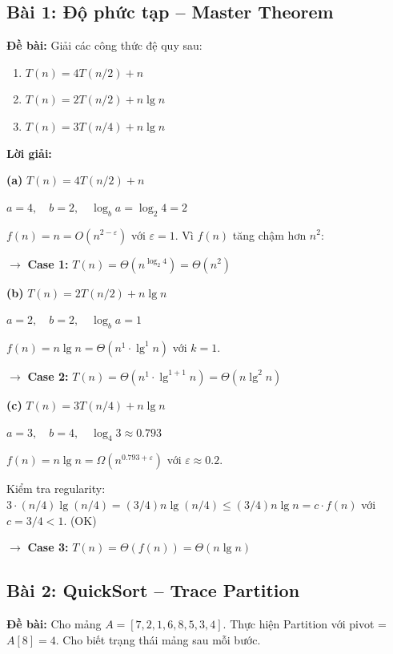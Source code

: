 \documentclass[10pt]{article}
\begin{document}
\subsection{Bài 1: Độ phức tạp -- Master Theorem}

\textbf{Đề bài:} Giải các công thức đệ quy sau:
\begin{enumerate}
\item[(a)] $T(n) = 4T(n/2) + n$
\item[(b)] $T(n) = 2T(n/2) + n \lg n$
\item[(c)] $T(n) = 3T(n/4) + n \lg n$
\end{enumerate}

\textbf{Lời giải:}

\textbf{(a)} $T(n) = 4T(n/2) + n$

$a = 4, \quad b = 2, \quad \log_b a = \log_2 4 = 2$

$f(n) = n = O(n^{2-\varepsilon})$ với $\varepsilon = 1$. Vì $f(n)$ tăng chậm hơn $n^2$:

$\to$ \textbf{Case 1:} $T(n) = \Theta(n^{\log_2 4}) = \boxed{\Theta(n^2)}$

\textbf{(b)} $T(n) = 2T(n/2) + n \lg n$

$a = 2, \quad b = 2, \quad \log_b a = 1$

$f(n) = n \lg n = \Theta(n^1 \cdot \lg^1 n)$ với $k = 1$.

$\to$ \textbf{Case 2:} $T(n) = \Theta(n^1 \cdot \lg^{1+1} n) = \boxed{\Theta(n \lg^2 n)}$

\textbf{(c)} $T(n) = 3T(n/4) + n \lg n$

$a = 3, \quad b = 4, \quad \log_4 3 \approx 0.793$

$f(n) = n \lg n = \Omega(n^{0.793 + \varepsilon})$ với $\varepsilon \approx 0.2$.

Kiểm tra regularity: $3 \cdot (n/4)\lg(n/4) = (3/4) n \lg(n/4) \leq (3/4) n \lg n = c \cdot f(n)$ với $c = 3/4 < 1$. (OK)

$\to$ \textbf{Case 3:} $T(n) = \Theta(f(n)) = \boxed{\Theta(n \lg n)}$

\subsection{Bài 2: QuickSort -- Trace Partition}

\textbf{Đề bài:} Cho mảng $A = [7, 2, 1, 6, 8, 5, 3, 4]$. Thực hiện Partition với pivot = $A[8] = 4$. Cho biết trạng thái mảng sau mỗi bước.
\end{document}
